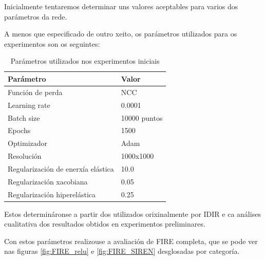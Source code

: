 Inicialmente tentaremos determinar uns valores aceptables para varios dos parámetros da rede.

A menos que especificado de outro xeito, os parámetros utilizados para os experimentos son os seguintes:
\begin{table}[h]
    \centering
    \begin{tabular}{|l|l|}
        \hline
        \textbf{Parámetro} & \textbf{Valor} \\
        \hline
        Función de perda & NCC \\
        \hline
        Learning rate & 0.0001 \\
        \hline
        Batch size & 10000 puntos \\
        \hline
        Epochs & 1500 \\
        \hline
        Optimizador & Adam \\
        \hline
        Resolución & 1000x1000 \\
        \hline
        Regularización de enerxía elástica & 10.0 \\
        \hline
        Regularización xacobiana & 0.05 \\
        \hline
        Regularización hiperelástica & 0.25 \\
        \hline
    \end{tabular}
    \caption{Parámetros utilizados nos experimentos iniciais}
    \label{tab:parametros_experimentos_iniciais}
\end{table}

Estos determináronse a partir dos utilizados orixinalmente por IDIR e ca análises cualitativa dos resultados obtidos en experimentos preliminares.

Con estos parámetros realizouse a avaliación de FIRE completa, que se pode ver nas figuras \ref{fig:FIRE_relu} e \ref{fig:FIRE_SIREN} desglosadas por categoría.

